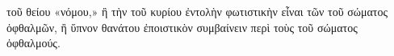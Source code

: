 τοῦ θείου «νόμου,» ἢ τὴν τοῦ κυρίου ἐντολὴν φωτιστικὴν εἶναι τῶν τοῦ σώματος ὀφθαλμῶν, ἢ ὕπνον θανάτου ἐποιστικὸν συμβαίνειν περὶ τοὺς τοῦ σώματος ὀφθαλμούς.